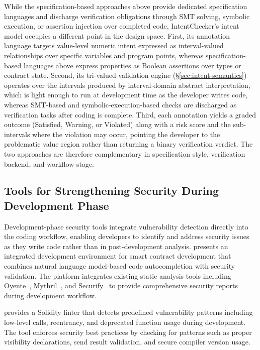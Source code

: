 \documentclass[pdflatex,sn-basic]{sn-jnl}%
\theoremstyle{thmstyleone}%
\theoremstyle{thmstyletwo}%
\theoremstyle{thmstylethree}%
\begin{document}
While the specification-based approaches above provide dedicated specification languages and discharge verification obligations through SMT solving, symbolic execution, or assertion injection over completed code, IntentChecker's intent model occupies a different point in the design space.
First, its annotation language targets value-level numeric intent expressed as interval-valued relationships over specific variables and program points, whereas specification-based languages above express properties as Boolean assertions over types or contract state.
Second, its tri-valued validation engine (§\ref{sec:intent-semantics}) operates over the intervals produced by interval-domain abstract interpretation, which is light enough to run at development time as the developer writes code, whereas SMT-based and symbolic-execution-based checks are discharged as verification tasks after coding is complete.
Third, each annotation yields a graded outcome (Satisfied, Warning, or Violated) along with a risk score and the sub-intervals where the violation may occur, pointing the developer to the problematic value region rather than returning a binary verification verdict.
The two approaches are therefore complementary in specification style, verification backend, and workflow stage.

\subsection{Tools for Strengthening Security During Development Phase}
Development-phase security tools integrate vulnerability detection directly into the coding workflow, enabling developers to identify and address security issues as they write code rather than in post-development analysis.
\citep{making} presents an integrated development environment for smart contract development that combines natural language model-based code autocompletion with security validation.
The platform integrates existing static analysis tools including Oyente~\citep{oyente}, Mythril~\citep{mythril}, and Securify~\citep{securify} to provide comprehensive security reports during development workflow.

\citep{solhint} provides a Solidity linter that detects predefined vulnerability patterns including low-level calls, reentrancy, and deprecated function usage during development.
The tool enforces security best practices by checking for patterns such as proper visibility declarations, send result validation, and secure compiler version usage.
\end{document}
